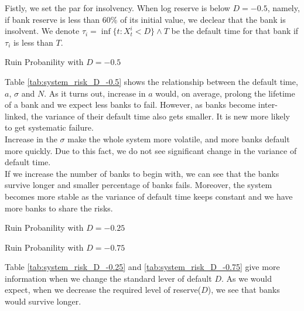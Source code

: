 \documentclass[a4paper, draft, 11pt]{article}
\begin{document}
Fistly, we set the par for insolvency. When log reserve is below $D = -0.5$, namely, if bank reserve is less than 60\% of its initial value, we declear that the bank is insolvent. We denote $\tau_i = \inf\{t:X_t^i<D\}\wedge T$ be the default time for that bank if $\tau_i$ is less than $T$. 

\begin{table}[bhtp]
	\centering
	
	\quad
	
	\quad
	
	\caption{Ruin Probanility with $D=-0.5$}
	\label{tab:system_risk_D_-0.5}
\end{table}
Table \ref{tab:system_risk_D_-0.5} shows the relationship between the default time, $a$, $\sigma$ and $N$. As it turns out, increase in $a$ would, on average, prolong the lifetime of a bank and we expect less banks to fail. However, as banks become inter-linked, the variance of their default time also gets smaller. It is new more likely to get systematic failure.\\

Increase in the $\sigma$ make the whole system more volatile, and more banks default more quickly. Due to this fact, we do not see significant change in the variance of default time. \\

If we increase the number of banks to begin with, we can see that the banks survive longer and smaller percentage of banks fails. Moreover, the system becomes more stable as the variance of default time keeps constant and we have more banks to share the risks. \\

\begin{table}[bhtp]
	\centering
	
	\quad
	
	\quad
	
	\caption{Ruin Probanility with $D=-0.25$}
	\label{tab:system_risk_D_-0.25}
\end{table}
\begin{table}[bhtp]
	\centering
	
	\quad
	
	\quad
	
	\caption{Ruin Probanility with $D=-0.75$}
	\label{tab:system_risk_D_-0.75}
\end{table}
Table \ref{tab:system_risk_D_-0.25} and \ref{tab:system_risk_D_-0.75} give more information when we change the standard lever of default $D$. As we would expect, when we decrease the required level of reserve($D$), we see that banks would survive longer.\\
\end{document}
